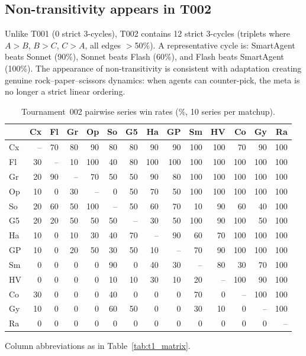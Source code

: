 \documentclass[11pt]{article}
\newcommand{\tOne}{T001}
\newcommand{\tTwo}{T002}
\begin{document}
\subsection{Non-transitivity appears in \tTwo}

Unlike \tOne{} (0 strict 3-cycles), \tTwo{} contains 12 strict 3-cycles (triplets where $A>B$, $B>C$, $C>A$, all edges $>$50\%).
A representative cycle is: SmartAgent beats Sonnet (90\%), Sonnet beats Flash (60\%), and Flash beats SmartAgent (100\%).
The appearance of non-transitivity is consistent with adaptation creating genuine rock--paper--scissors dynamics: when agents can counter-pick, the meta is no longer a strict linear ordering.

\begin{table}[t]
\centering
\footnotesize
\setlength{\tabcolsep}{2.5pt}
\renewcommand{\arraystretch}{1.05}
\caption{Tournament~002 pairwise series win rates (\%, 10 series per matchup).}
\label{tab:t2_matrix}
\begin{tabular}{lrrrrrrrrrrrrr}
\toprule
 & Cx & Fl & Gr & Op & So & G5 & Ha & GP & Sm & HV & Co & Gy & Ra \\
\midrule
Cx & -- & 70 & 80 & 90 & 80 & 80 & 90 & 90 & 100 & 100 & 70 & 90 & 100 \\
Fl & 30 & -- & 10 & 100 & 40 & 80 & 100 & 100 & 100 & 100 & 100 & 100 & 100 \\
Gr & 20 & 90 & -- & 70 & 50 & 50 & 90 & 80 & 100 & 100 & 100 & 100 & 100 \\
Op & 10 & 0 & 30 & -- & 0 & 50 & 70 & 50 & 100 & 100 & 100 & 100 & 100 \\
So & 20 & 60 & 50 & 100 & -- & 50 & 60 & 70 & 10 & 90 & 60 & 40 & 100 \\
G5 & 20 & 20 & 50 & 50 & 50 & -- & 30 & 50 & 100 & 90 & 100 & 50 & 100 \\
Ha & 10 & 0 & 10 & 30 & 40 & 70 & -- & 90 & 60 & 70 & 100 & 100 & 100 \\
GP & 10 & 0 & 20 & 50 & 30 & 50 & 10 & -- & 70 & 90 & 100 & 100 & 100 \\
Sm & 0 & 0 & 0 & 0 & 90 & 0 & 40 & 30 & -- & 80 & 30 & 70 & 100 \\
HV & 0 & 0 & 0 & 0 & 10 & 10 & 30 & 10 & 20 & -- & 100 & 90 & 100 \\
Co & 30 & 0 & 0 & 0 & 40 & 0 & 0 & 0 & 70 & 0 & -- & 100 & 100 \\
Gy & 10 & 0 & 0 & 0 & 60 & 50 & 0 & 0 & 30 & 10 & 0 & -- & 100 \\
Ra & 0 & 0 & 0 & 0 & 0 & 0 & 0 & 0 & 0 & 0 & 0 & 0 & -- \\
\bottomrule
\end{tabular}
\vspace{0.3em}
\noindent\footnotesize{Column abbreviations as in Table~\ref{tab:t1_matrix}.}
\end{table}
\end{document}

